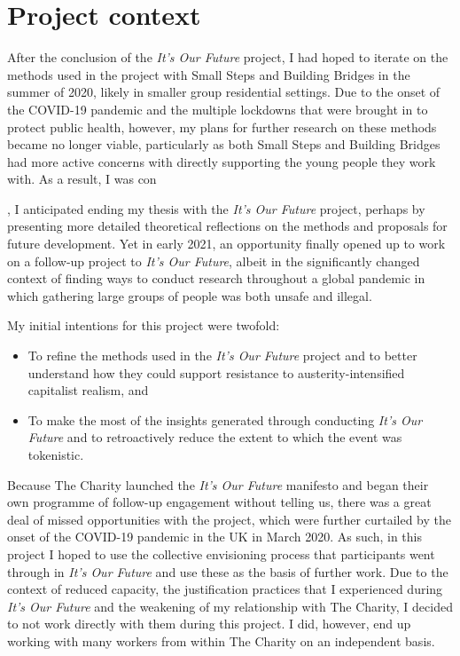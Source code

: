 \section{Project context}
\label{sec:8-1-context}
After the conclusion of the \textit{It's Our Future} project, I had hoped to iterate on the methods used in the project with Small Steps and Building Bridges in the summer of 2020, likely in smaller group residential settings.  Due to the onset of the COVID-19 pandemic and the multiple lockdowns that were brought in to protect public health, however, my plans for further research on these methods became no longer viable, particularly as both Small Steps and Building Bridges had more active concerns with directly supporting the young people they work with. As a result, I was con


, I anticipated ending my thesis with the \textit{It's Our Future} project, perhaps by presenting more detailed theoretical reflections on the methods and proposals for future development. Yet in early 2021, an opportunity finally opened up to work on a follow-up project to \textit{It's Our Future}, albeit in the significantly changed context of finding ways to conduct research throughout a global pandemic in which gathering large groups of people was both unsafe and illegal. 

My initial intentions for this project were twofold: 
\begin{itemize}
    \item To refine the methods used in the \emph{It's Our Future} project and to better understand how they could support resistance to austerity-intensified capitalist realism, and 
    \item To make the most of the insights generated through conducting \emph{It's Our Future} and to retroactively reduce the extent to which the event was tokenistic.
\end{itemize}
Because The Charity launched the \emph{It's Our Future} manifesto and began their own programme of follow-up engagement without telling us, there was a great deal of missed opportunities with the project, which were further curtailed by the onset of the COVID-19 pandemic in the UK in March 2020. As such, in this project I hoped to use the collective envisioning process that participants went through in \emph{It's Our Future} and use these as the basis of further work. Due to the context of reduced capacity, the justification practices that I experienced during \emph{It's Our Future} and the weakening of my relationship with The Charity, I decided to not work directly with them during this project. I did, however, end up working with many workers from within The Charity on an independent basis.

